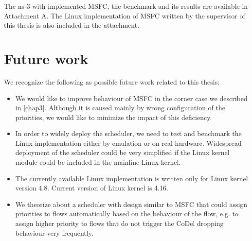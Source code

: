 The ns-3 with implemented MSFC, the benchmark and its results are available in Attachment A. The Linux implementation of MSFC written by the supervisor of this thesis is also included in the attachment. 

\section*{Future work}

We recognize the following as possible future work related to this thesis:
\begin{itemize}
	\item We would like to improve behaviour of MSFC in the corner case we described in \autoref{chap3}. Although it is caused mainly by wrong configuration of the priorities, we would like to minimize the impact of this deficiency.
	\item In order to widely deploy the scheduler, we need to test and benchmark the Linux implementation either by emulation or on real hardware. Widespread deployment of the scheduler could be very simplified if the Linux kernel module could be included in the mainline Linux kernel.
	\item The currently available Linux implementation is written only for Linux kernel version 4.8. Current version of Linux kernel is 4.16.
	\item We theorize about a scheduler with design similar to MSFC that could assign priorities to flows automatically based on the behaviour of the flow, e.g. to assign higher priority to flows that do not trigger the CoDel dropping behaviour very frequently.
\end{itemize}
